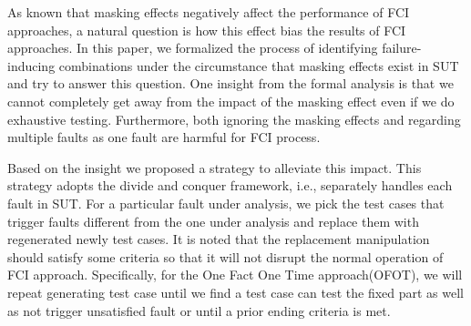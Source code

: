 \documentclass{sig-alternate}
\begin{document}

As known that masking effects negatively affect the performance of FCI approaches, a natural question is how this effect bias the results of FCI approaches. In this paper, we formalized the process of identifying failure-inducing combinations under the circumstance that masking effects exist in SUT and try to answer this question. One insight from the formal analysis is that we cannot completely get away from the impact of the masking effect even if we do exhaustive testing. Furthermore, both ignoring the masking effects and regarding multiple faults as one fault are harmful for FCI process.

Based on the insight we proposed a strategy to alleviate this impact. This strategy adopts the divide and conquer framework, i.e., separately handles each fault in SUT. For a particular fault under analysis, we pick the test cases that trigger faults different from the one under analysis and replace them with regenerated newly test cases. It is noted that the replacement manipulation should satisfy some criteria so that it will not disrupt the normal operation of FCI approach. Specifically, for the One Fact One Time approach(OFOT), we will repeat generating test case until we find a test case can test the fixed part as well as not trigger unsatisfied fault or until a prior ending criteria is met.


\end{document}
